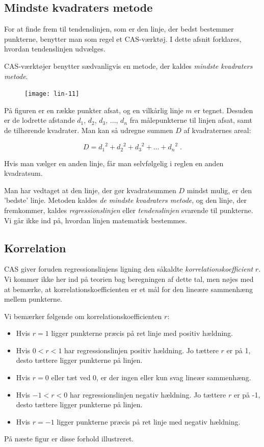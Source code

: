 \documentclass[12pt,oneside,a4paper]{article}
\begin{document}
\subsection{Mindste kvadraters metode}

For at finde frem til tendenslinjen, som er den linje, der bedst bestemmer
punkterne, benytter man som regel et CAS-værktøj. I dette afsnit forklares,
hvordan tendenslinjen udvælges.

CAS-værktøjer benytter sædvanligvis en metode, der kaldes {\em mindste
kvadraters metode}.

\begin{figure}[H]
    \centering
    \texttt{[image: lin-11]}
    \caption{}
\end{figure}

På figuren er en række punkter afsat, og en vilkårlig linje $m$ er tegnet.
Desuden er de lodrette afstande $d_1$, $d_2$, $d_3$, ..., $d_n$ fra
målepunkterne til linjen afsat, samt de tilhørende kvadrater. Man kan så
udregne summen $D$ af kvadraternes areal:

\[
D = {d_1}^2 + {d_2}^2 + {d_3}^2 + \ldots + {d_n}^2 \; . 
\]

Hvis man vælger en anden linje, får man selvfølgelig i reglen en anden kvadratsum.

Man har vedtaget at den linje, der gør kvadratsummen $D$ mindst mulig, er den
'bedste' linje. Metoden kaldes {\em de mindste kvadraters metode}, og den linje, der
fremkommer, kaldes {\em regressionslinjen} eller {\em tendenslinjen} svarende
til punkterne. Vi går ikke ind på, hvordan linjen matematisk bestemmes. 

\subsection{Korrelation}
CAS giver foruden regressionslinjens ligning den såkaldte {\em
korrelations\-koef\-fi\-cient} $r$. Vi kommer ikke her ind på teorien bag
beregningen af dette tal, men nøjes med at bemærke, at
korrelationskoefficienten er et mål for den lineære sammenhæng mellem
punkterne.

Vi bemærker følgende om korrelationskoefficienten $r$:

\begin{itemize}
    \item Hvis $r = 1$ ligger punkterne præcis på ret linje med positiv hældning.
    \item Hvis $0 < r < 1$ har regressionslinjen positiv hældning. Jo tættere $r$
        er på 1, desto tættere ligger punkterne på linjen.
    \item Hvis $r = 0$ eller tæt ved 0, er der ingen eller kun svag lineær sammenhæng.
    \item Hvis $-1 < r < 0$ har regressionslinjen negativ hældning. Jo tættere $r$
        er på -1, desto tættere ligger punkterne på linjen.
    \item Hvis $r = -1$ ligger punkterne præcis på ret linje med negativ hældning. 
\end{itemize}
På næste figur er disse forhold illustreret.
\end{document}
